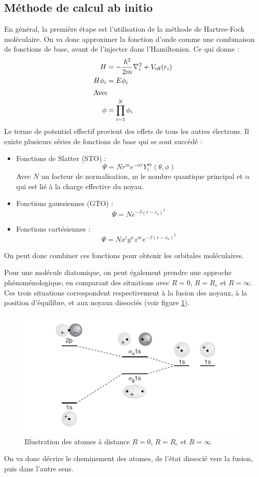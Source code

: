 \subsection{Méthode de calcul ab initio}


En général, la première étape est l'utilisation de la méthode de Hartree-Fock moléculaire. On va donc approximer la fonction d'onde comme une combinaison de fonctions de base, avant de l'injecter dans l'Hamiltonien. Ce qui donne :
\begin{align*}
    H &= -\dfrac{\hbar^2}{2m}\nabla^2_i + V_\text{eff}(r_i)\\
    H\phi_i &= E\phi_i\\
    \intertext{Avec} 
    \phi &= \prod_{i=1}^N\phi_i
\end{align*}
Le terme de potentiel effectif provient des effets de tous les autres électrons. Il existe plusieurs séries de fonctions de base qui se sont succédé :

\begin{itemize}
    \item Fonctions de Slatter (STO) : 
    \[ \Psi = Nr^me^{-\alpha r}Y_l^m(\theta,\phi) \]
    Avec $N$ un facteur de normalisation, m le nombre quantique principal et $\alpha$ qui est lié à la charge effective du noyau.
    \item Fonctions gaussiennes (GTO) :
    \[ \Psi = Ne^{-\beta(r-r_0)^2} \]
    \item Fonctions cartésiennes :
    \[ \Psi = Nx^ly^nz^me^{-\beta(r-r_0)^2} \]
\end{itemize}
On peut donc combiner ces fonctions pour obtenir les orbitales moléculaires.


Pour une molécule diatomique, on peut également prendre une approche phénoménologique, en comparant des situations avec $R = 0$, $R = R_e$ et $R = \infty$. Ces trois situations correspondent respectivement à la fusion des noyaux, à la position d'équilibre, et aux noyaux dissociés (voir figure \ref{fig:Dist_mol}).
\begin{figure}
    \centering
    \includegraphics[scale=0.6]{Images3/Distance mol.PNG}
    \caption{Illustration des atomes à distance $R=0$, $R=R_e$ et $R=\infty$}
    \label{fig:Dist_mol}
\end{figure}
On va donc décrire le cheminement des atomes, de l'état dissocié vers la fusion, puis dans l'autre sens.



